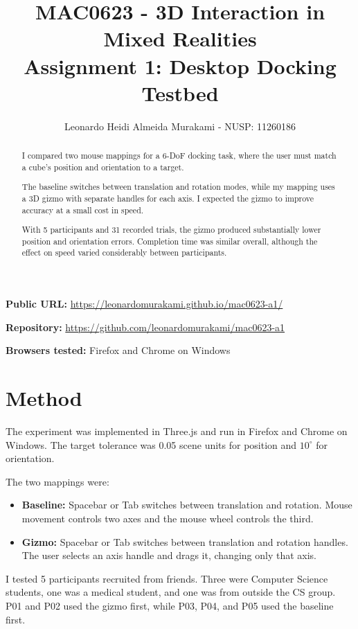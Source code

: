 \documentclass[11pt]{article}
\title{MAC0623 - 3D Interaction in Mixed Realities \\ Assignment 1: Desktop Docking Testbed}
\author{Leonardo Heidi Almeida Murakami - NUSP: 11260186}
\date{}
\begin{document}
\maketitle

\noindent
\textbf{Public URL:}
\url{https://leonardomurakami.github.io/mac0623-a1/}

\textbf{Repository:}
\url{https://github.com/leonardomurakami/mac0623-a1}

\textbf{Browsers tested:} Firefox and Chrome on Windows

\begin{abstract}
I compared two mouse mappings for a 6-DoF docking task, where the user must
match a cube's position and orientation to a target.

The baseline switches between translation and rotation modes, while my
mapping uses a 3D gizmo with separate handles for each axis. I expected the
gizmo to improve accuracy at a small cost in speed.

With 5 participants and 31 recorded trials, the gizmo produced substantially
lower position and orientation errors. Completion time was similar overall,
although the effect on speed varied considerably between participants.
\end{abstract}

\section{Method}

The experiment was implemented in Three.js and run in Firefox and Chrome on
Windows. The target tolerance was 0.05 scene units for position and
$10^\circ$ for orientation.

The two mappings were:

\begin{itemize}
    \item \textbf{Baseline:} Spacebar or Tab switches between translation
    and rotation. Mouse movement controls two axes and the mouse wheel
    controls the third.

    \item \textbf{Gizmo:} Spacebar or Tab switches between translation and
    rotation handles. The user selects an axis handle and drags it, changing
    only that axis.
\end{itemize}

I tested 5 participants recruited from friends. Three were Computer Science
students, one was a medical student, and one was from outside the CS group.
P01 and P02 used the gizmo first, while P03, P04, and P05 used the baseline
first.
\end{document}
